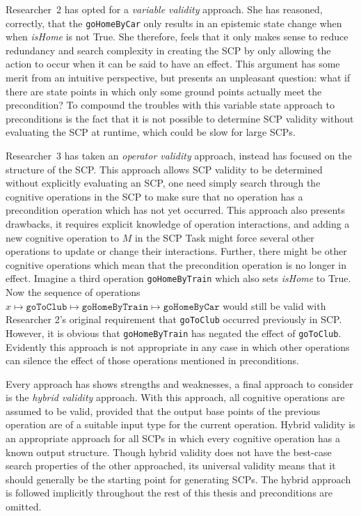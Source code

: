 Researcher~2 has opted for a \textit{variable validity} approach. She has reasoned, correctly, that the \texttt{goHomeByCar} only results in an epistemic state change when when \textit{isHome} is not True. She therefore, feels that it only makes sense to reduce redundancy and search complexity in creating the SCP by only allowing the action to occur when it can be said to have an effect. This argument has some merit from an intuitive perspective, but presents an unpleasant question: what if there are state points in which only some ground points actually meet the precondition? To compound the troubles with this variable state approach to preconditions is the fact that it is not possible to determine SCP validity without evaluating the SCP at runtime, which could be slow for large SCPs.

Researcher~3 has taken an \textit{operator validity} approach, instead has focused on the structure of the SCP. This approach allows SCP validity to be determined without explicitly evaluating an SCP, one need simply search through the cognitive operations in the SCP to make sure that no operation has a precondition operation which has not yet occurred. This approach also presents drawbacks, it requires explicit knowledge of operation interactions, and adding a new cognitive operation to $M$ in the SCP Task might force several other operations to update or change their interactions. Further, there might be other cognitive operations which mean that the precondition operation is no longer in effect. Imagine a third operation \texttt{goHomeByTrain} which also sets \textit{isHome} to True. Now the sequence of operations $x\longmapsto \texttt{goToClub} \longmapsto \texttt{goHomeByTrain} \longmapsto \texttt{goHomeByCar}$ would still be valid with Researcher 2's original requirement that  \texttt{goToClub} occurred previously in SCP. However, it is obvious that \texttt{goHomeByTrain} has negated the effect of \texttt{goToClub}. Evidently this approach is not appropriate in any case in which other operations can silence the effect of those operations mentioned in preconditions.

Every approach has shows strengths and weaknesses, a final approach to consider is the \textit{hybrid validity} approach. With this approach, all cognitive operations are assumed to be valid, provided that the output base points of the previous operation are of a suitable input type for the current operation. Hybrid validity is an appropriate approach for all SCPs in which every cognitive operation has a known output structure. Though hybrid validity does not have the best-case search properties of the other approached, its universal validity means that it should generally be the starting point for generating SCPs. The hybrid approach is followed implicitly throughout the rest of this thesis and preconditions are omitted.

